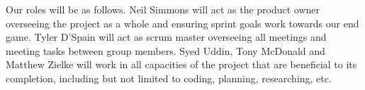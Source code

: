 
Our roles will be as follows. Neil Simmons will act as the product owner overseeing the project as a whole and ensuring sprint goals work towards our end game. Tyler D'Spain will act as scrum master overseeing all meetings and meeting tasks between group members. Syed Uddin, Tony McDonald and Matthew Zielke will work in all capacities of the project that are beneficial to its completion, including but not limited to coding, planning, researching, etc.